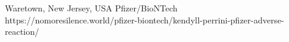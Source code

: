           {Waretown, New Jersey, USA}
          {}
          {Pfizer/BioNTech}
          {}
          {
          }
          {https://nomoresilence.world/pfizer-biontech/kendyll-perrini-pfizer-adverse-reaction/}

